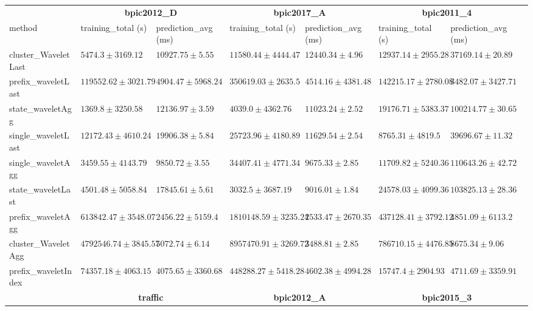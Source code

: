 \documentclass[twoside,11pt]{Latex/Classes/PhDthesisPSnPDF}
\begin{document}
\begin{table}[h]
{\begin{tabular}{llllllll}
		\bottomrule
		\toprule
		& \multicolumn{2}{c}{{\bfseries bpic2012\_D}} & \multicolumn{2}{c}{{\bfseries bpic2017\_A}} & \multicolumn{2}{c}{{\bfseries bpic2011\_4}} \\ \cmidrule(lr){2-3} \cmidrule(lr){4-5} \cmidrule(lr){6-7}
		method  & training\_total (s) & prediction\_avg (ms) & training\_total (s) & prediction\_avg (ms) & training\_total (s) & prediction\_avg (ms) \\ \midrule
		cluster\_WaveletLast & $5474.3 \pm 3169.12$ & $10927.75 \pm 5.55$ & $11580.44 \pm 4444.47$ & $12440.34 \pm 4.96$ & $12937.14 \pm 2955.28$ & $37169.14 \pm 20.89$ \\ 
		prefix\_waveletLast & $119552.62 \pm 3021.79$ & $4904.47 \pm 5968.24$ & $350619.03 \pm 2635.5$ & $4514.16 \pm 4381.48$ & $142215.17 \pm 2780.08$ & $\mathbf{3482.07 \pm 3427.71}$ \\ 
		state\_waveletAgg & $\mathbf{1369.8 \pm 3250.58}$ & $12136.97 \pm 3.59$ & $4039.0 \pm 4362.76$ & $11023.24 \pm 2.52$ & $19176.71 \pm 5383.37$ & $100214.77 \pm 30.65$ \\ 
		single\_waveletLast & $12172.43 \pm 4610.24$ & $19906.38 \pm 5.84$ & $25723.96 \pm 4180.89$ & $11629.54 \pm 2.54$ & $\mathbf{8765.31 \pm 4819.5}$ & $39696.67 \pm 11.32$ \\ 
		single\_waveletAgg & $3459.55 \pm 4143.79$ & $9850.72 \pm 3.55$ & $34407.41 \pm 4771.34$ & $9675.33 \pm 2.85$ & $11709.82 \pm 5240.36$ & $110643.26 \pm 42.72$ \\ 
		state\_waveletLast & $4501.48 \pm 5058.84$ & $17845.61 \pm 5.61$ & $\mathbf{3032.5 \pm 3687.19}$ & $9016.01 \pm 1.84$ & $24578.03 \pm 4099.36$ & $103825.13 \pm 28.36$ \\ 
		prefix\_waveletAgg & $613842.47 \pm 3548.07$ & $\mathbf{2456.22 \pm 5159.4}$ & $1810148.59 \pm 3235.24$ & $\mathbf{2533.47 \pm 2670.35}$ & $437128.41 \pm 3792.12$ & $4851.09 \pm 6113.2$ \\ 
		cluster\_WaveletAgg & $4792546.74 \pm 3845.57$ & $5072.74 \pm 6.14$ & $8957470.91 \pm 3269.72$ & $3488.81 \pm 2.85$ & $786710.15 \pm 4476.85$ & $8675.34 \pm 9.06$ \\ 
		prefix\_waveletIndex & $74357.18 \pm 4063.15$ & $4075.65 \pm 3360.68$ & $448288.27 \pm 5418.28$ & $4602.38 \pm 4994.28$ & $15747.4 \pm 2904.93$ & $4711.69 \pm 3359.91$ \\ 
		\bottomrule
		\toprule
		& \multicolumn{2}{c}{{\bfseries traffic}} & \multicolumn{2}{c}{{\bfseries bpic2012\_A}} & \multicolumn{2}{c}{{\bfseries bpic2015\_3}} \\ \cmidrule(lr){2-3} \cmidrule(lr){4-5} \cmidrule(lr){6-7}

\end{tabular}}
\end{table}
\end{document}
